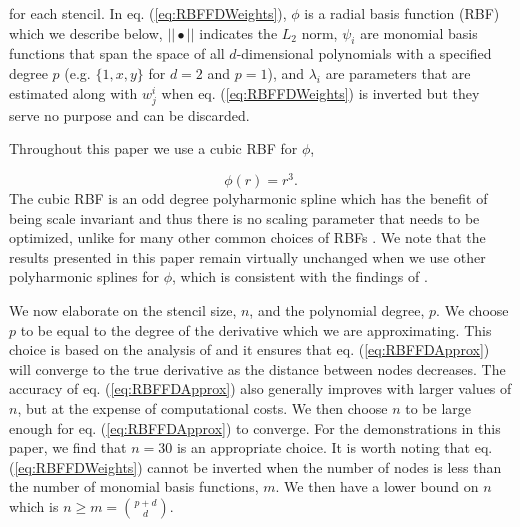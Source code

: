 \documentclass[10pt,a4paper]{article}
\begin{document}
for each stencil. In eq. (\ref{eq:RBFFDWeights}), $\phi$ is a radial basis function (RBF) which we describe below, $||\bullet||$ indicates the $L_2$ norm, $\psi_i$ are monomial basis functions that span the space of all $d$-dimensional polynomials with a specified degree $p$ (e.g. $\{1, x, y\}$ for $d=2$ and $p=1$), and $\lambda_i$ are parameters that are estimated along with $w^i_j$ when eq. (\ref{eq:RBFFDWeights}) is inverted but they serve no purpose and can be discarded. 

Throughout this paper we use a cubic RBF for $\phi$,

\begin{equation}\label{eq:Cubic}
\phi(r) = r^3.
\end{equation}
The cubic RBF is an odd degree polyharmonic spline which has the benefit of being scale invariant and thus there is no scaling parameter that needs to be optimized, unlike for many other common choices of RBFs \citep[e.g.][]{Larsson2003}.  We note that the results presented in this paper remain virtually unchanged when we use other polyharmonic splines for $\phi$, which is consistent with the findings of \citet{Flyer2016}. 

We now elaborate on the stencil size, $n$, and the polynomial degree, $p$.  We choose $p$ to be equal to the degree of the derivative which we are approximating. This choice is based on the analysis of \citet{Flyer2016} and it ensures that eq. (\ref{eq:RBFFDApprox}) will converge to the true derivative as the distance between nodes decreases. The accuracy of eq. (\ref{eq:RBFFDApprox}) also generally improves with larger values of $n$, but at the expense of computational costs. We then choose $n$ to be large enough for eq. (\ref{eq:RBFFDApprox}) to converge. For the demonstrations in this paper, we find that $n=30$ is an appropriate choice.  It is worth noting that eq. (\ref{eq:RBFFDWeights}) cannot be inverted when the number of nodes is less than the number of monomial basis functions, $m$.  We then have a lower bound on $n$ which is $n \ge m = {{p+d}\choose{d}}$.   
\end{document}

